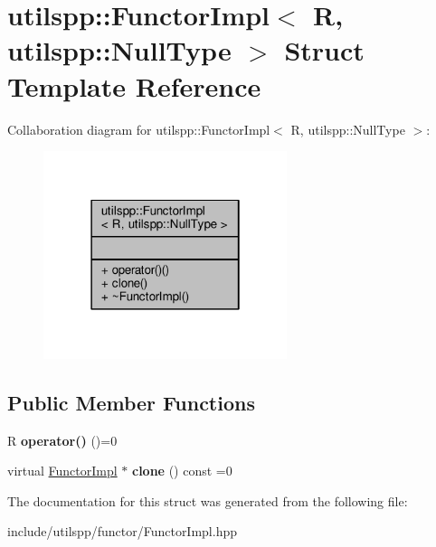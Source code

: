 \hypertarget{structutilspp_1_1FunctorImpl_3_01R_00_01utilspp_1_1NullType_01_4}{\section{utilspp\-:\-:Functor\-Impl$<$ R, utilspp\-:\-:Null\-Type $>$ Struct Template Reference}
\label{structutilspp_1_1FunctorImpl_3_01R_00_01utilspp_1_1NullType_01_4}
}


Collaboration diagram for utilspp\-:\-:Functor\-Impl$<$ R, utilspp\-:\-:Null\-Type $>$\-:\nopagebreak
\begin{figure}[H]
\begin{center}
\leavevmode
\includegraphics[width=202pt]{structutilspp_1_1FunctorImpl_3_01R_00_01utilspp_1_1NullType_01_4__coll__graph}
\end{center}
\end{figure}
\subsection*{Public Member Functions}
\begin{DoxyCompactItemize}
\item 
\hypertarget{structutilspp_1_1FunctorImpl_3_01R_00_01utilspp_1_1NullType_01_4_a6f337e57bea1af0a0760d6444f66e148}{R {\bfseries operator()} ()=0}\label{structutilspp_1_1FunctorImpl_3_01R_00_01utilspp_1_1NullType_01_4_a6f337e57bea1af0a0760d6444f66e148}

\item 
\hypertarget{structutilspp_1_1FunctorImpl_3_01R_00_01utilspp_1_1NullType_01_4_af30cce7c7b872a2595c7099e0e7d88e2}{virtual \hyperlink{structutilspp_1_1FunctorImpl}{Functor\-Impl} $\ast$ {\bfseries clone} () const =0}\label{structutilspp_1_1FunctorImpl_3_01R_00_01utilspp_1_1NullType_01_4_af30cce7c7b872a2595c7099e0e7d88e2}

\end{DoxyCompactItemize}


The documentation for this struct was generated from the following file\-:\begin{DoxyCompactItemize}
\item 
include/utilspp/functor/Functor\-Impl.\-hpp\end{DoxyCompactItemize}
